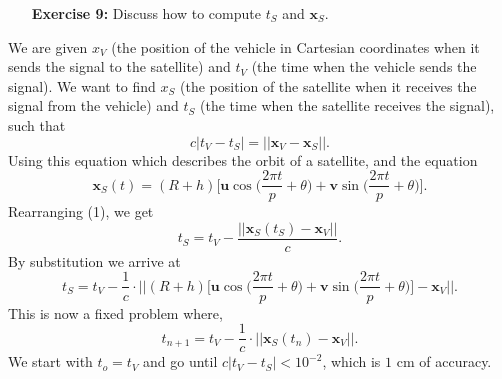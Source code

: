 \documentclass[11pt]{article}
\theoremstyle{definition}
\newcommand{\1}[1]{\mathbf{1} \left \{ #1 \right \}}
\begin{document}
\begin{itemize}
\item[{\textbf{Exercise 9:}}] Discuss how to compute $t_S$ and $\textbf{x}_S$.
\end{itemize}
We are given $x_V$ (the position of the vehicle in Cartesian coordinates when it sends the signal to the satellite) and $t_V$ (the time when the vehicle sends the signal).  We want to find $x_S$ (the position of the satellite when it receives the signal from the vehicle) and $t_S$ (the time when the satellite receives the signal), such that
\begin{equation}
    c|t_V - t_S| = ||\textbf{x}_V - \textbf{x}_S||.
\end{equation}
Using this equation which describes the orbit of a satellite, and the equation
\begin{equation}
    \textbf{x}_S (t) = (R+h) \Bigg[\textbf{u}\cos \bigg(\frac{2\pi t}{p} + \theta \bigg) + \textbf{v}\sin \bigg(\frac{2\pi t}{p} + \theta \bigg)\Bigg].
\end{equation}
Rearranging (1), we get
\[t_S = t_V - \frac{\big|\big|\textbf{x}_S (t_S) - \textbf{x}_V\big|\big|}{c}.\]
By substitution we arrive at
\[t_S = t_V - \frac{1}{c} \cdot \Bigg|\Bigg|(R+h) \Bigg[\textbf{u}\cos \bigg(\frac{2\pi t}{p} + \theta \bigg) + \textbf{v}\sin \bigg(\frac{2\pi t}{p} + \theta \bigg)\Bigg] - \textbf{x}_V\Bigg|\Bigg|.\]
This is now a fixed problem where,
\[t_{n+1} = t_V - \frac{1}{c} \cdot \big|\big|\textbf{x}_S (t_n) - \textbf{x}_V\big|\big|.\]
We start with $t_o = t_V$ and go until \(c|t_V - t_S| < 10^{-2}\), which is $1$ cm of accuracy.
\end{document}

